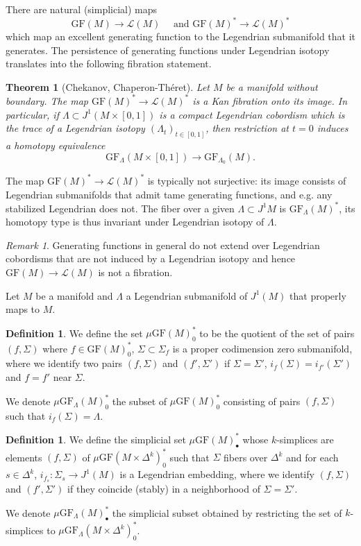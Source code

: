 \documentclass[12pt,a4paper]{article}
\numberwithin{equation}{section}
\newtheorem{thm}[equation]{Theorem}
\theoremstyle{definition}
\newtheorem{dfn}[equation]{Definition}
\theoremstyle{remark}
\newtheorem{rem}[equation]{Remark}
\newcommand{\LL}{\mathcal{L}}
\newcommand{\GF}{\mathrm{GF}}
\begin{document}
There are natural (simplicial) maps
\[\GF(M)\to \LL(M) \quad \text{ and } \GF(M)^* \to \LL(M)^*\]
which map an excellent generating function to the Legendrian submanifold that it generates.
The persistence of generating functions under Legendrian isotopy translates into the following fibration statement.

\begin{thm}[Chekanov, Chaperon-Théret]\label{thm:spacelevelchekanov}
Let $M$ be a manifold without boundary. The map $\GF(M)^* \to \LL(M)^*$ is a Kan fibration onto its image.
In particular, if $\Lambda\subset J^1(M\times[0,1])$ is
a compact Legendrian cobordism which is the trace of a Legendrian isotopy $(\Lambda_t)_{t\in[0,1]}$,
then restriction at $t=0$ induces a homotopy equivalence
\[\GF_\Lambda(M\times [0,1])\to \GF_{\Lambda_0}(M).\]
\end{thm}

The map $\GF(M)^* \to \LL(M)^*$ is typically not surjective: its image consists of Legendrian submanifolds
that admit tame generating functions, and e.g. any stabilized Legendrian does not.
The fiber over a given $\Lambda\subset J^1 M$
is $\GF_\Lambda(M)^*$, its homotopy type is thus invariant under Legendrian isotopy
of $\Lambda$.

\begin{rem}
Generating functions in general do not extend over Legendrian cobordisms that are not induced by a Legendrian isotopy
and hence $\GF(M)\to \LL(M)$ is not a fibration.
\end{rem}

Let $M$ be a manifold and $\Lambda$ a Legendrian submanifold of $J^1(M)$ that properly maps to $M$.

\begin{dfn}
We define the set $\mu\GF(M)_0^*$ to be the quotient of the set of pairs $(f,\Sigma)$ where $f\in \GF(M)_0^*$,
$\Sigma \subset \Sigma_f$ is a proper codimension zero submanifold, where we identify two pairs $(f,\Sigma)$ and $(f',\Sigma')$
if $\Sigma=\Sigma'$, $i_f(\Sigma)=i_{f'}(\Sigma')$ and $f=f'$ near $\Sigma$.

We denote $\mu\GF_\Lambda(M)_0^*$ the subset of $\mu\GF(M)_0^*$ consisting of pairs $(f,\Sigma)$ such that $i_f(\Sigma)=\Lambda$.
\end{dfn}

\begin{dfn}\label{dfn:muGF}
We define the simplicial set $\mu \GF(M)^*_\bullet$ whose $k$-simplices
are elements $(f,\Sigma)$ of $\mu\GF(M\times \Delta^k)_0^*$ such that $\Sigma$ fibers over $\Delta^k$
and for each $s\in \Delta^k$, $i_{f_s} : \Sigma_s \to J^1(M)$ is a Legendrian embedding,
where we identify $(f,\Sigma)$ and $(f',\Sigma')$ if they coincide (stably) in a neighborhood of
$\Sigma=\Sigma'$.

We denote $\mu \GF_\Lambda(M)^*_\bullet$ the simplicial subset obtained by
restricting the set of $k$-simplices to $\mu\GF_\Lambda(M\times\Delta^k)_0^*$.
\end{dfn}
\end{document}
